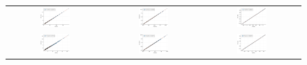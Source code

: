 \begin{figure}[hbtp]
	\centering
	\begin{tabular}{ccc}
		\includegraphics[width=0.33\textwidth]{Figures/PotentialStudy/Psi_P_CorrelationTest} &
		\includegraphics[width=0.33\textwidth]{Figures/PotentialStudy/Psi_E0_CorrelationTest} &
		\includegraphics[width=0.33\textwidth]{Figures/PotentialStudy/Psi_theta_CorrelationTest} \\
		\includegraphics[width=0.33\textwidth]{Figures/PotentialStudy/e_P_CorrelationTest} &
		\includegraphics[width=0.33\textwidth]{Figures/PotentialStudy/e_E0_CorrelationTest} &
		\includegraphics[width=0.33\textwidth]{Figures/PotentialStudy/e_theta_CorrelationTest} \\		%

\end{tabular}
\end{figure}
